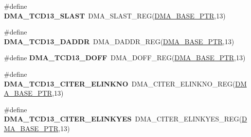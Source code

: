 \begin{DoxyCompactItemize}
\item 
\hypertarget{group___d_m_a___register___accessor___macros_ga441804340780ca409f6bfe9fbf95d79f}{}\#define {\bfseries D\+M\+A\+\_\+\+T\+C\+D13\+\_\+\+S\+L\+A\+S\+T}~D\+M\+A\+\_\+\+S\+L\+A\+S\+T\+\_\+\+R\+E\+G(\hyperlink{group___d_m_a___peripheral_ga6997fbc1b1973e9f27170217a3bd6f22}{D\+M\+A\+\_\+\+B\+A\+S\+E\+\_\+\+P\+T\+R},13)\label{group___d_m_a___register___accessor___macros_ga441804340780ca409f6bfe9fbf95d79f}

\item 
\hypertarget{group___d_m_a___register___accessor___macros_ga1245031f8c78e442dc8fc199e90fd4ef}{}\#define {\bfseries D\+M\+A\+\_\+\+T\+C\+D13\+\_\+\+D\+A\+D\+D\+R}~D\+M\+A\+\_\+\+D\+A\+D\+D\+R\+\_\+\+R\+E\+G(\hyperlink{group___d_m_a___peripheral_ga6997fbc1b1973e9f27170217a3bd6f22}{D\+M\+A\+\_\+\+B\+A\+S\+E\+\_\+\+P\+T\+R},13)\label{group___d_m_a___register___accessor___macros_ga1245031f8c78e442dc8fc199e90fd4ef}

\item 
\hypertarget{group___d_m_a___register___accessor___macros_ga08cd40b8ffba8b31eed59271d92c8411}{}\#define {\bfseries D\+M\+A\+\_\+\+T\+C\+D13\+\_\+\+D\+O\+F\+F}~D\+M\+A\+\_\+\+D\+O\+F\+F\+\_\+\+R\+E\+G(\hyperlink{group___d_m_a___peripheral_ga6997fbc1b1973e9f27170217a3bd6f22}{D\+M\+A\+\_\+\+B\+A\+S\+E\+\_\+\+P\+T\+R},13)\label{group___d_m_a___register___accessor___macros_ga08cd40b8ffba8b31eed59271d92c8411}

\item 
\hypertarget{group___d_m_a___register___accessor___macros_gaf9ec26f9d5fe7cd9d8e82e00cc1e753c}{}\#define {\bfseries D\+M\+A\+\_\+\+T\+C\+D13\+\_\+\+C\+I\+T\+E\+R\+\_\+\+E\+L\+I\+N\+K\+N\+O}~D\+M\+A\+\_\+\+C\+I\+T\+E\+R\+\_\+\+E\+L\+I\+N\+K\+N\+O\+\_\+\+R\+E\+G(\hyperlink{group___d_m_a___peripheral_ga6997fbc1b1973e9f27170217a3bd6f22}{D\+M\+A\+\_\+\+B\+A\+S\+E\+\_\+\+P\+T\+R},13)\label{group___d_m_a___register___accessor___macros_gaf9ec26f9d5fe7cd9d8e82e00cc1e753c}

\item 
\hypertarget{group___d_m_a___register___accessor___macros_ga6749c180a5157609bfdb279a46ca1a53}{}\#define {\bfseries D\+M\+A\+\_\+\+T\+C\+D13\+\_\+\+C\+I\+T\+E\+R\+\_\+\+E\+L\+I\+N\+K\+Y\+E\+S}~D\+M\+A\+\_\+\+C\+I\+T\+E\+R\+\_\+\+E\+L\+I\+N\+K\+Y\+E\+S\+\_\+\+R\+E\+G(\hyperlink{group___d_m_a___peripheral_ga6997fbc1b1973e9f27170217a3bd6f22}{D\+M\+A\+\_\+\+B\+A\+S\+E\+\_\+\+P\+T\+R},13)\label{group___d_m_a___register___accessor___macros_ga6749c180a5157609bfdb279a46ca1a53}


\end{DoxyCompactItemize}
